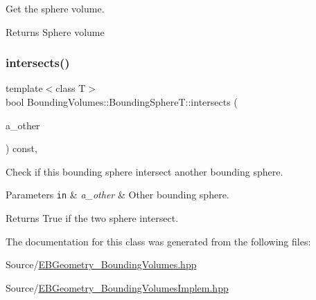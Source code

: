 Get the sphere volume. 

\begin{DoxyReturn}{Returns}
Sphere volume 
\end{DoxyReturn}
\mbox{\label{classEBGeometry_1_1BoundingVolumes_1_1BoundingSphereT_af3a1030fd3e2cd2d3c86c95460781410}} 
\subsubsection{\texorpdfstring{intersects()}{intersects()}}
{\footnotesize\ttfamily template$<$class T$>$ \\
bool Bounding\+Volumes\+::\+Bounding\+Sphere\+T\+::intersects (\begin{DoxyParamCaption}\item[{const \hyperlink{classEBGeometry_1_1BoundingVolumes_1_1BoundingSphereT}{Bounding\+SphereT}$<$ T $>$ \&}]{a\+\_\+other }\end{DoxyParamCaption}) const\hspace{0.3cm}{\ttfamily [inline]}, {\ttfamily [noexcept]}}



Check if this bounding sphere intersect another bounding sphere. 


\begin{DoxyParams}[1]{Parameters}
\mbox{\tt in}  & {\em a\+\_\+other} & Other bounding sphere. \\
\hline
\end{DoxyParams}
\begin{DoxyReturn}{Returns}
True if the two sphere intersect. 
\end{DoxyReturn}


The documentation for this class was generated from the following files\+:\begin{DoxyCompactItemize}
\item 
Source/\hyperlink{EBGeometry__BoundingVolumes_8hpp}{E\+B\+Geometry\+\_\+\+Bounding\+Volumes.\+hpp}\item 
Source/\hyperlink{EBGeometry__BoundingVolumesImplem_8hpp}{E\+B\+Geometry\+\_\+\+Bounding\+Volumes\+Implem.\+hpp}\end{DoxyCompactItemize}
